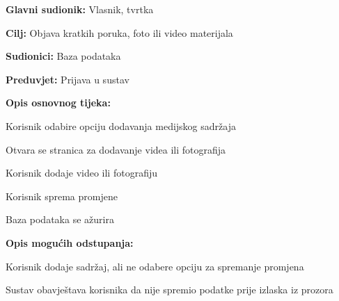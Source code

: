 				\noindent {}
				\begin{packed_item}
					
					\item \textbf{Glavni sudionik: } Vlasnik, tvrtka
					\item  \textbf{Cilj:} Objava kratkih poruka, foto ili video materijala 
					\item  \textbf{Sudionici:} Baza podataka
					\item  \textbf{Preduvjet:} Prijava u sustav
					\item  \textbf{Opis osnovnog tijeka:}
					
					\item[] \begin{packed_enum}
						
						\item Korisnik odabire opciju dodavanja medijskog sadržaja 
						\item Otvara se stranica za dodavanje videa ili fotografija
						\item Korisnik dodaje video ili fotografiju
						\item Korisnik sprema promjene
						\item Baza podataka se ažurira
					\end{packed_enum}
					
					\item  \textbf{Opis mogućih odstupanja:}
					
					\item[] \begin{packed_item}
						
						\item[3.a] Korisnik dodaje sadržaj, ali ne odabere opciju za spremanje promjena
						\item[] \begin{packed_enum}
							
							\item Sustav obavještava korisnika da nije spremio podatke prije izlaska iz prozora
							
						\end{packed_enum}
					\end{packed_item}
				\end{packed_item}
			
